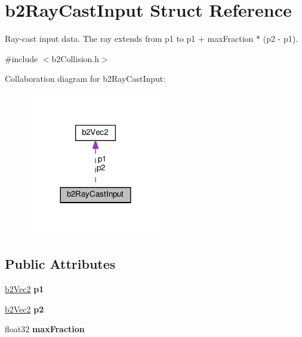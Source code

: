 \hypertarget{structb2RayCastInput}{}\section{b2\+Ray\+Cast\+Input Struct Reference}
\label{structb2RayCastInput}


Ray-\/cast input data. The ray extends from p1 to p1 + max\+Fraction $\ast$ (p2 -\/ p1).  




{\ttfamily \#include $<$b2\+Collision.\+h$>$}



Collaboration diagram for b2\+Ray\+Cast\+Input\+:
\nopagebreak
\begin{figure}[H]
\begin{center}
\leavevmode
\includegraphics[width=168pt]{structb2RayCastInput__coll__graph}
\end{center}
\end{figure}
\subsection*{Public Attributes}
\begin{DoxyCompactItemize}
\item 
\mbox{\label{structb2RayCastInput_a7254a7062422833b1124fa464ab4caf3}} 
\hyperlink{structb2Vec2}{b2\+Vec2} {\bfseries p1}
\item 
\mbox{\label{structb2RayCastInput_a850102c843469781a3a627c871043d0b}} 
\hyperlink{structb2Vec2}{b2\+Vec2} {\bfseries p2}
\item 
\mbox{\label{structb2RayCastInput_acb5c88e0ef2c3716a1334611522ab0b2}} 
float32 {\bfseries max\+Fraction}
\end{DoxyCompactItemize}


